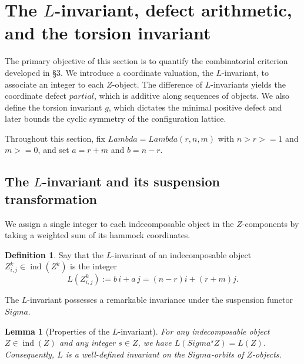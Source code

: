 \documentclass[11pt, a4paper]{article}
\newtheorem{lemma}[theorem]{Lemma}
\theoremstyle{definition}
\newtheorem{definition}[theorem]{Definition}
\def\Lambda{Lambda}%
\def\Sigma{Sigma}%
\def\partial{partial}%
\def\ge{>=}%
\def\mathbb#1{#1}%
\def\mathcal#1{#1}%
\begin{document}
\section{The \texorpdfstring{$L$}{L}-invariant, defect arithmetic, and the torsion invariant}\label{sec:L-defect}

The primary objective of this section is to quantify the combinatorial criterion developed in \S 3. We introduce a coordinate valuation, the $L$-invariant, to associate an integer to each $\mathcal Z$-object. The difference of $L$-invariants yields the coordinate defect $\partial$, which is additive along sequences of objects. We also define the torsion invariant $g$, which dictates the minimal positive defect and later bounds the cyclic symmetry of the configuration lattice.

Throughout this section, fix $\Lambda = \Lambda(r,n,m)$ with $n > r \ge 1$ and $m \ge 0$, and set $a = r+m$ and $b = n-r$.

\subsection{The \texorpdfstring{$L$}{L}-invariant and its suspension transformation}\label{subsec:L-inv}

We assign a single integer to each indecomposable object in the $\mathcal Z$-components by taking a weighted sum of its hammock coordinates.

\begin{definition}\label{def:L}
Say that the $L$-invariant of an indecomposable object $Z_{i,j}^k \in \operatorname{ind}(\mathcal Z^k)$ is the integer
\[
  L(Z_{i,j}^k) := b\,i + a\,j = (n-r)i + (r+m)j.
\]
\end{definition}

The $L$-invariant possesses a remarkable invariance under the suspension functor $\Sigma$.

\begin{lemma}[Properties of the $L$-invariant]\label{lem:L-props}
For any indecomposable object $Z \in \operatorname{ind}(\mathcal Z)$ and any integer $s \in \mathbb Z$, we have $L(\Sigma^s Z) = L(Z)$. Consequently, $L$ is a well-defined invariant on the $\Sigma$-orbits of $\mathcal Z$-objects.
\end{lemma}
\end{document}
